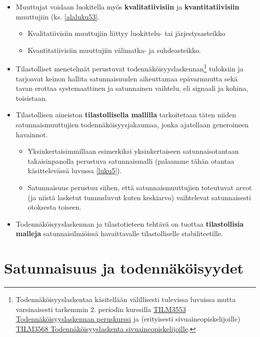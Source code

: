 \documentclass[
]{book}
\providecommand{\tightlist}{%
  \setlength{\itemsep}{0pt}\setlength{\parskip}{0pt}}
\begin{document}
\begin{itemize}
\tightlist
\item
  Muuttujat voidaan luokitella myös \textbf{kvalitatiivisiin} ja \textbf{kvantitatiivisiin} muuttujiin (ks. \ref{alaluku53}.

  \begin{itemize}
  \tightlist
  \item
    Kvalitatiivisiin muuttujiin liittyy luokittelu- tai järjestysasteikko
  \item
    Kvantitatiivisiin muuttujiin välimatka- ja suhdeasteikko.
  \end{itemize}
\item
  Tilastolliset menetelmät perustuvat todennäköisyyslaskennan\footnote{Todennäköisyyslaskentaa käsitellään välillisesti tulevissa luvuissa mutta varsinaisesti tarkemmin 2. periodin kurssilla \href{https://opas.peppi.utu.fi/fi/opintojakso/TILM3553/1734?period=2022-2024}{TILM3553 Todennäköisyyslaskennan peruskurssi} ja (erityisesti sivuaineopiskelijoille) \href{https://opas.peppi.utu.fi/fi/opintojakso/TILM3568/3385?period=2022-2024}{TILM3568 Todennäköisyyslaskenta sivuaineopiskelijoille}.} tuloksiin ja tarjoavat keinon hallita satunnaisuuden aiheuttamaa epävarmuutta sekä tavan erottaa systemaattinen ja satunnainen vaihtelu, eli signaali ja kohina, toisistaan.
\item
  Tilastollisen aineiston \textbf{tilastollisella mallilla} tarkoitetaan täten niiden satunnaismuuttujien todennäköisyysjakaumaa, jonka ajatellaan generoineen havainnot.

  \begin{itemize}
  \tightlist
  \item
    Yksinkertaisimmillaan esimerkiksi yksinkertaiseen satunnaisotantaan takaisinpanolla perustuva satunnaismalli (palaamme tähän otantaa käsittelevässä luvussa \ref{luku5}).
  \item
    Satunnaisuus perustuu siihen, että satunnaismuuttujien toteutuvat arvot (ja niistä lasketut tunnusluvut kuten keskiarvo) vaihtelevat satunnaisesti otoksesta toiseen.
  \end{itemize}
\item
  Todennäköisyyslaskennan ja tilastotieteen tehtävä on tuottaa \textbf{tilastollisia malleja} satunnaisilmiöissä havaittavalle tilastolliselle stabiliteetille.
\end{itemize}

\hypertarget{alaluku42}{%
\section{Satunnaisuus ja todennäköisyydet}\label{alaluku42}}
\end{document}
